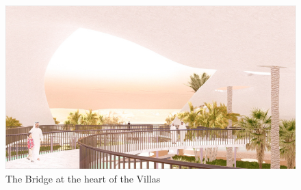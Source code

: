 \begin{figure}[H]
	\centering
	\includegraphics[width=\linewidth]{src/graphics/riyadh-dream-villas--perspective-01.jpg}
	\caption*{%
		The Bridge at the heart of the Villas
	}
	\label{
		fig:riyadh-dream-villas--perspective-01
	}
\end{figure}
